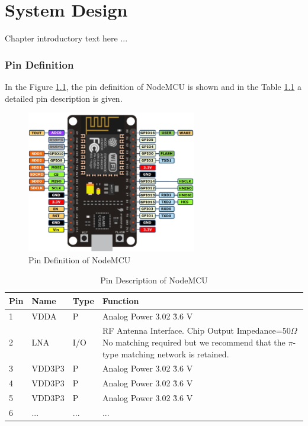 \chapter{System Design}
Chapter introductory text here ...

\subsection{Pin Definition}
In the Figure \ref{fig-pin}, the pin definition of NodeMCU \cite{nodemcu2014} is shown and in  the Table \ref{table1} a detailed pin description is given. 
 
\begin{figure}[H]
\begin{center}
\includegraphics[width=0.66\textwidth]{figpin}
\end{center}
\caption{Pin Definition of NodeMCU}
\label{fig-pin}
\end{figure}

\begin{table}
\centering
\caption{Pin Description of NodeMCU}
\label{table1}
\begin{tabular}{|l|l|l|p{8cm}|}
\hline 
\textbf{Pin} & \textbf{Name} & \textbf{Type} & \textbf{Function} \tabularnewline
\hline 
1 & VDDA & P & Analog Power 3.02 \~ 3.6 V \tabularnewline \hline 
2 & LNA & I/O & RF Antenna Interface. Chip Output Impedance=50$\Omega$ No matching required but we recommend that the $\pi$-type matching network is retained. \tabularnewline \hline 
3 & VDD3P3 & P & Analog Power 3.02 \~ 3.6 V \tabularnewline \hline 
4 & VDD3P3 & P & Analog Power 3.02 \~ 3.6 V \tabularnewline \hline 
5 & VDD3P3 & P & Analog Power 3.02 \~ 3.6 V \tabularnewline \hline 
6 & ... & ... & ... \tabularnewline \hline 
\end{tabular}
\end{table}



